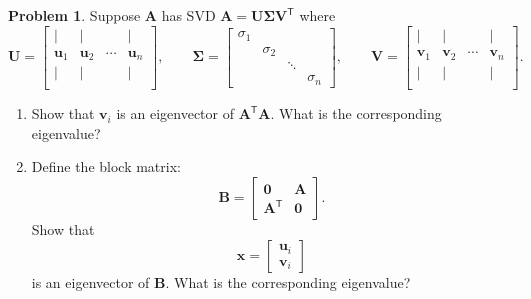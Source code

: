 \documentclass[12pt]{article}
\theoremstyle{definition}
\newtheorem{problem}{Problem}
\renewcommand{\vec}{\mathbf}
\newcommand{\T}{\mathsf{T}}
\begin{document}
\begin{problem}
    Suppose $\vec{A}$ has SVD $\vec{A} = \vec{U} \vec{\Sigma} \vec{V}^\T$ where 
    \[
        \vec{U} = 
        \begin{bmatrix}
            |&|&&|\\
            \vec{u}_1 & \vec{u}_2 & \cdots & \vec{u}_n\\
            |&|&&|\\
        \end{bmatrix},
        \qquad
        \vec{\Sigma} = \begin{bmatrix} \sigma_1 \\ &\sigma_2 \\ &&\ddots \\ &&& \sigma_n\end{bmatrix}
        ,\qquad
        \vec{V}
    =   \begin{bmatrix}
            |&|&&|\\
            \vec{v}_1 & \vec{v}_2 & \cdots & \vec{v}_n\\
            |&|&&|\\
        \end{bmatrix}. 
    \]
    \begin{enumerate}
        \item Show that $\vec{v}_i$ is an eigenvector of $\vec{A}^\T \vec{A}$. What is the corresponding eigenvalue?

        \item

    Define the block matrix:
    \[
        \vec{B} = 
        \begin{bmatrix} \vec{0}& \vec{A} \\ 
            \vec{A}^\T & \vec{0}
        \end{bmatrix}.
    \]
    Show that 
    \[
        \vec{x} = \begin{bmatrix} \vec{u}_i \\ \vec{v}_i \end{bmatrix}
    \]
    is an eigenvector of $\vec{B}$.
    What is the corresponding eigenvalue?
    \end{enumerate}
\end{problem}
\end{document}
